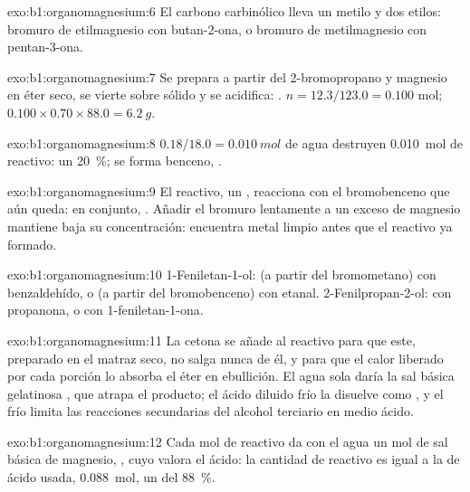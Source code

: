 \begin{solution}{exo:b1:organomagnesium:6}
El carbono carbinólico lleva un metilo y dos etilos: bromuro de
etilmagnesio con butan-2-ona, o bromuro de metilmagnesio con
pentan-3-ona.
\end{solution}

\begin{solution}{exo:b1:organomagnesium:7}
Se prepara  a partir del 2-bromopropano y magnesio en
éter seco, se vierte sobre  sólido y se acidifica:
. $n = 12.3/123.0 = 0.100$ mol;
$0.100 \times 0.70 \times 88.0 = \qty{6.2}{g}$.
\end{solution}

\begin{solution}{exo:b1:organomagnesium:8}
$0.18/18.0 = \qty{0.010}{mol}$ de agua destruyen \qty{0.010}{mol} de
reactivo: un \qty{20}{\percent}; se forma benceno,
.
\end{solution}

\begin{solution}{exo:b1:organomagnesium:9}
El reactivo, un , reacciona con el bromobenceno que aún queda:
en conjunto, . Añadir el
bromuro lentamente a un exceso de magnesio mantiene baja su concentración:
encuentra metal limpio antes que el reactivo ya formado.
\end{solution}

\begin{solution}{exo:b1:organomagnesium:10}
1-Feniletan-1-ol:  (a partir del bromometano) con
benzaldehído, o  (a partir del bromobenceno) con etanal.
2-Fenilpropan-2-ol:  con propanona, o  con
1-feniletan-1-ona.
\end{solution}

\begin{solution}{exo:b1:organomagnesium:11}
La cetona se añade al reactivo para que este, preparado en el matraz
seco, no salga nunca de él, y para que el calor liberado por cada porción
lo absorba el éter en ebullición. El agua sola daría la sal básica
gelatinosa , que atrapa el producto; el ácido diluido frío
la disuelve como , y el frío limita las reacciones secundarias
del alcohol terciario en medio ácido.
\end{solution}

\begin{solution}{exo:b1:organomagnesium:12}
Cada mol de reactivo da con el agua un mol de sal básica de magnesio,
, cuyo  valora el ácido: la
cantidad de reactivo es igual a la de ácido usada, \qty{0.088}{mol}, un
 del \qty{88}{\percent}.
\end{solution}

